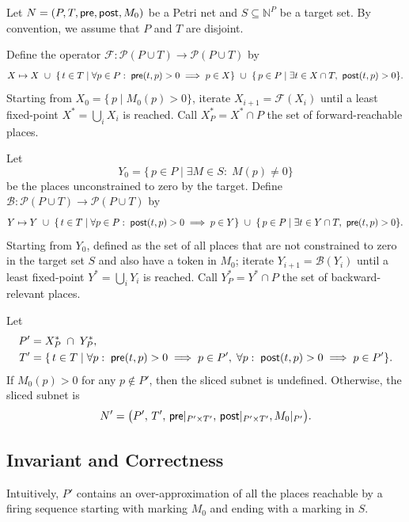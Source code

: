 Let $N=(P,T,\mathsf{pre},\mathsf{post}, M_0)$ be a Petri net and $S\subseteq\mathbb{N}^P$ be a target set.
%
By convention, we assume that $P$ and $T$ are disjoint.
 
\begin{definition}
	Define the operator $\mathcal{F}:\mathcal{P}(P\cup T)\to\mathcal{P}(P\cup T)$ by
	\[
	X \mapsto X
	~\cup~
	\{\,t\in T \mid \forall p\in P:\; \mathsf{pre}(t,p)>0 \implies p\in X\}
	~\cup~
	\{\,p\in P \mid \exists t\in X\cap T,\ \mathsf{post}(t,p)>0\}.
	\]
	Starting from $X_0 = \{\,p\mid M_0(p)>0\}$, iterate
	$X_{i+1} = \mathcal{F}(X_i)$ until a least fixed-point
	$X^*=\bigcup_i X_i$ is reached.  Call $X^*_P = X^*\cap P$ the set of
	forward-reachable places.
\end{definition}

\begin{definition}
	Let
	\[
	Y_0 = \{\,p\in P \mid \exists M\in S:\;M(p)\neq0\}
	\]
	be the places unconstrained to zero by the target.  Define
	$\mathcal{B}:\mathcal{P}(P\cup T)\to\mathcal{P}(P\cup T)$ by
	\[
	Y \mapsto Y
	~\cup~
	\{\,t\in T \mid \forall p\in P:\; \mathsf{post}(t,p)>0 \implies p\in Y\}
	~\cup~
	\{\,p\in P \mid \exists t\in Y\cap T,\ \mathsf{pre}(t,p)>0\}.
	\]
	Starting from $Y_0$, defined as the set of all places that are not constrained to zero in the target set $S$ and also have a token in $M_0$;
	iterate $Y_{i+1} = \mathcal{B}(Y_i)$ until a least fixed-point
	$Y^*=\bigcup_i Y_i$ is reached.  Call $Y^*_P = Y^*\cap P$ the set of
	backward-relevant places.
\end{definition}

\begin{definition}
  Let
  \begin{align*}
    P' &= X^*_P \;\cap\; Y^*_P,
    \\
    T' &= \{\,t\in T \mid
    \forall p:\;\mathsf{pre}(t,p)>0\implies p\in P',\;
    \forall p:\;\mathsf{post}(t,p)>0\implies p\in P'
    \}.
  \end{align*}
  If $M_0(p) > 0$ for any $p \not\in P'$, then the sliced subnet is undefined.
  Otherwise, the sliced subnet is
  \[
  N' = \bigl(P',\,T',\,\mathsf{pre}|_{P'\times T'},\,\mathsf{post}|_{P'\times T'}, M_0|_{P'}\bigr).
  \]
\end{definition}

\subsection{Invariant and Correctness}

Intuitively, $P'$ contains an over-approximation of all the places reachable by a firing sequence starting with marking $M_0$ and ending with a marking in $S$.

